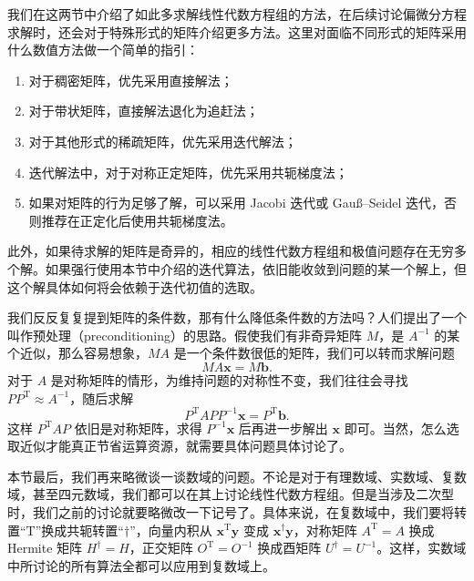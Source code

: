 我们在这两节中介绍了如此多求解线性代数方程组的方法，在后续讨论偏微分方程求解时，还会对于特殊形式的矩阵介绍更多方法。这里对面临不同形式的矩阵采用什么数值方法做一个简单的指引：
\begin{enumerate}
\item 对于稠密矩阵，优先采用直接解法；
\item 对于带状矩阵，直接解法退化为追赶法；
\item 对于其他形式的稀疏矩阵，优先采用迭代解法；
\item 迭代解法中，对于对称正定矩阵，优先采用共轭梯度法；
\item 如果对矩阵的行为足够了解，可以采用 Jacobi 迭代或 Gauß--Seidel 迭代，否则推荐在正定化后使用共轭梯度法。
\end{enumerate}

此外，如果待求解的矩阵是奇异的，相应的线性代数方程组和极值问题存在无穷多个解。如果强行使用本节中介绍的迭代算法，依旧能收敛到问题的某一个解上，但这个解具体如何将会依赖于迭代初值的选取。

我们反反复复提到矩阵的条件数，那有什么降低条件数的方法吗？人们提出了一个叫作预处理（preconditioning）的思路。假使我们有非奇异矩阵 $M$，是 $A^{-1}$ 的某个近似，那么容易想象，$MA$ 是一个条件数很低的矩阵，我们可以转而求解问题
\begin{equation}
MA\bm x=M\bm b.
\tag{3.2.39}
\end{equation}
对于 $A$ 是对称矩阵的情形，为维持问题的对称性不变，我们往往会寻找 $PP^{\mathrm T}\approx A^{-1}$，随后求解
\begin{equation}
P^{\mathrm T}APP^{-1}\bm x=P^{\mathrm T}\bm b.
\tag{3.2.40}
\end{equation}
这样 $P^{\mathrm T}AP$ 依旧是对称矩阵，求得 $P^{-1}\bm x$ 后再进一步解出 $\bm x$ 即可。当然，怎么选取近似才能真正节省运算资源，就需要具体问题具体讨论了。

本节最后，我们再来略微谈一谈数域的问题。不论是对于有理数域、实数域、复数域，甚至四元数域，我们都可以在其上讨论线性代数方程组。但是当涉及二次型时，我们之前的讨论就要略微改一下记号了。具体来说，在复数域中，我们要将转置“$\mathrm T$”换成共轭转置“$\dagger$”，向量内积从 $\bm x^{\mathrm T}\bm y$ 变成 $\bm x^\dagger\bm y$，对称矩阵 $A^{\mathrm T}=A$ 换成 Hermite 矩阵 $H^\dagger=H$，正交矩阵 $O^{\mathrm T}=O^{-1}$ 换成酉矩阵 $U^\dagger=U^{-1}$。这样，实数域中所讨论的所有算法全都可以应用到复数域上。

